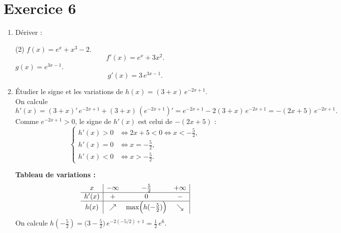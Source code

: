 \documentclass{article}
\theoremstyle{definition}
\begin{document}
\section*{Exercice 6}
\begin{enumerate}
  \item Dériver :
  \begin{tasks}(2)
    \task \(f(x)=e^{x}+x^3-2\).\\
      \[
        f'(x)=e^x + 3x^2.
      \]
    \task \(g(x)=e^{3x-1}\).\\
      \[
        g'(x)=3\,e^{3x-1}.
      \]
  \end{tasks}
  \item Étudier le signe et les variations de 
  \(\displaystyle h(x)=(3+x)\,e^{-2x+1}\).\\
  On calcule
  \[
    h'(x)
    = (3+x)'\,e^{-2x+1} + (3+x)\,(e^{-2x+1})'
    = e^{-2x+1} -2(3+x)\,e^{-2x+1}
    = -(2x+5)\,e^{-2x+1}.
  \]
  Comme \(e^{-2x+1}>0\), le signe de \(h'(x)\) est celui de \(-(2x+5)\) :
  \[
    \begin{cases}
      h'(x)>0 &\iff 2x+5<0 \iff x<-\tfrac{5}{2},\\
      h'(x)=0 &\iff x=-\tfrac{5}{2},\\
      h'(x)<0 &\iff x>-\tfrac{5}{2}.
    \end{cases}
  \]
  \medskip

  \noindent\textbf{Tableau de variations :}
  \[
    \begin{array}{c|ccc|c}
      x        & -\infty      & -\tfrac{5}{2} & +\infty \\ \hline
      h'(x)    & +            & 0             & -       \\ \hline
      h(x)     & \nearrow     & \displaystyle \max\Bigl(h(-\tfrac{5}{2})\Bigr)
                  & \searrow
    \end{array}
  \]
  On calcule \(h(-\tfrac{5}{2}) = \bigl(3 - \tfrac{5}{2}\bigr)\,e^{-2(-5/2)+1}
    = \tfrac12\,e^6.\)
\end{enumerate}
\end{document}
